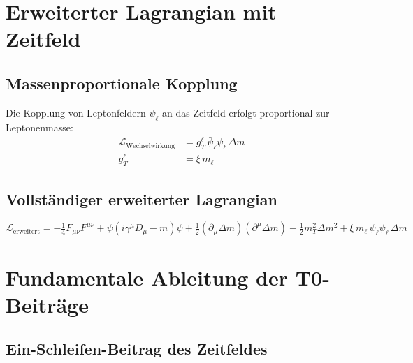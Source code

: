 \documentclass[12pt,a4paper]{article}
\begin{document}
	\section{Erweiterter Lagrangian mit Zeitfeld}
	
	\subsection{Massenproportionale Kopplung}
	
	Die Kopplung von Leptonfeldern $\psi_\ell$ an das Zeitfeld erfolgt proportional zur Leptonenmasse:
	\begin{align}
		\mathcal{L}_{\mathrm{Wechselwirkung}} &= g_T^\ell \, \bar{\psi}_\ell \psi_\ell \, \Delta m \label{eq:interaction_lagrangian}\\
		g_T^\ell &= \xi \, m_\ell \label{eq:coupling_strength}
	\end{align}
	
	\subsection{Vollständiger erweiterter Lagrangian}
	
	\begin{keyresult}
		\begin{equation}
			\mathcal{L}_{\mathrm{erweitert}} = -\tfrac{1}{4} F_{\mu\nu}F^{\mu\nu} + \bar{\psi}(i\gamma^\mu D_\mu - m)\psi + \tfrac{1}{2}(\partial_\mu \Delta m)(\partial^\mu \Delta m) - \tfrac{1}{2} m_T^2 \Delta m^2 + \xi \, m_\ell \,\bar{\psi}_\ell \psi_\ell \, \Delta m
			\label{eq:extended_lagrangian}
		\end{equation}
	\end{keyresult}
	
	\section{Fundamentale Ableitung der T0-Beiträge}
	
	\subsection{Ein-Schleifen-Beitrag des Zeitfeldes}
	
\end{document}
